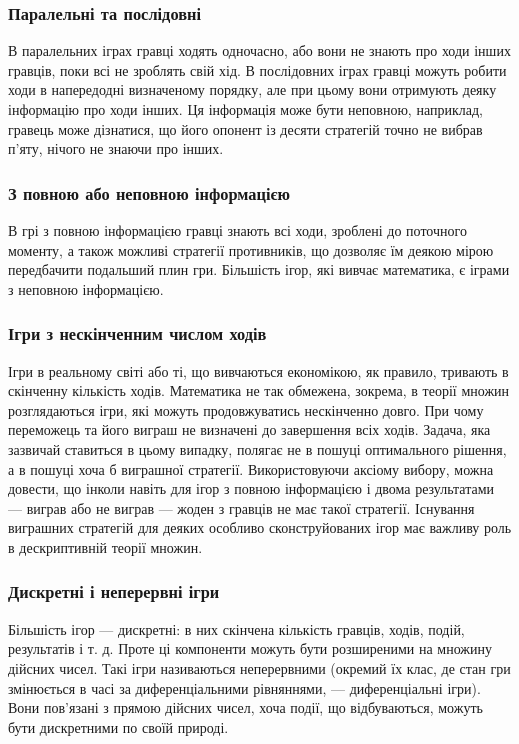\documentclass[a4paper]{article}
\begin{document}
\subsubsection*{Паралельні та послідовні}
В паралельних іграх гравці ходять одночасно, або вони не знають про ходи інших гравців, поки всі не зроблять свій хід. В послідовних іграх гравці можуть робити ходи в напередодні визначеному порядку, але при цьому вони отримують деяку інформацію про ходи інших. Ця інформація може бути неповною, наприклад, гравець може дізнатися, що його опонент із десяти стратегій точно не вибрав п'яту, нічого не знаючи про інших.

\subsubsection*{З повною або неповною інформацією}
В грі з повною інформацією гравці знають всі ходи, зроблені до поточного моменту, а також можливі стратегії противників, що дозволяє їм деякою мірою передбачити подальший плин гри. Більшість ігор, які вивчає математика, є іграми з неповною інформацією.

\subsubsection*{Ігри з нескінченним числом ходів}
Ігри в реальному світі або ті, що вивчаються економікою, як правило, тривають в скінченну кількість ходів. Математика не так обмежена, зокрема, в теорії множин розглядаються ігри, які можуть продовжуватись нескінченно довго. При чому переможець та його виграш не визначені до завершення всіх ходів. Задача, яка зазвичай ставиться в цьому випадку, полягає не в пошуці оптимального рішення, а в пошуці хоча б виграшної стратегії. Використовуючи аксіому вибору, можна довести, що інколи навіть для ігор з повною інформацією і двома результатами — виграв або не виграв — жоден з гравців не має такої стратегії. Існування виграшних стратегій для деяких особливо сконструйованих ігор має важливу роль в дескриптивній теорії множин.

\subsubsection*{Дискретні і неперервні ігри}
Більшість ігор — дискретні: в них скінчена кількість гравців, ходів, подій, результатів і т. д. Проте ці компоненти можуть бути розширеними на множину дійсних чисел. Такі ігри називаються неперервними (окремий їх клас, де стан гри змінюється в часі за диференціальними рівняннями, — диференціальні ігри). Вони пов'язані з прямою дійсних чисел, хоча події, що відбуваються, можуть бути дискретними по своїй природі.
\end{document}

